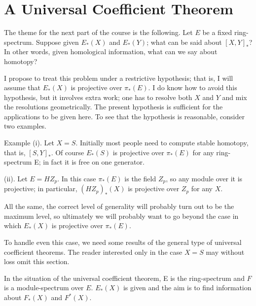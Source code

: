 \documentclass[../main]{subfiles}
\begin{document}



\chapter{A Universal Coefficient Theorem}
\label{sec:p3c13}
The theme for the next part of the course is the following. Let $E$ be a fixed ring-spectrum. Suppose given $E_\ast(X)$ and $E_\ast(Y)$; what can be said about $[X,Y]_\ast$? In other words, given homological information, what can we say about homotopy?

I propose to treat this problem under a restrictive hypothesis; that is, I will assume that $E_\ast(X)$ is projective over $\pi_\ast(E)$. I do know how to avoid this hypothesis, but it involves extra work; one has to resolve both $X$ and $Y$ and mix the resolutions geometrically. The present hypothesis is sufficient for the applications to be given here. To see that the hypothesis is reasonable, consider two examples.

Example (i). Let $X=S$. Initially most people need to compute stable homotopy, that is, $[S, Y]_\ast$. Of course $E_\ast(S)$ is projective over $\pi_\ast(E)$ for any ring-spectrum E; in fact it is free on one generator. %

(ii). Let $E = HZ_p$. In this case $\pi_\ast(E)$ is the field $Z_p$, so any module over it is projective; in particular, $(HZ_p)_\ast(X)$ is projective over $Z_p$ for any $X$.

All the same, the correct level of generality will probably turn out to be the maximum level, so ultimately we will probably want to go beyond the case in which $E_\ast(X)$ is projective over $\pi_\ast(E)$.

To handle even this case, we need some results of the general type of universal coefficient theorems. The reader interested only in the case $X=S$ may without loss omit this section.

In the situation of the universal coefficient theorem, E is the ring-spectrum and $F$ is a module-spectrum over $E$. $E_\ast(X)$ is given and the aim is to find information about $F_\ast(X)$ and $F^\ast(X)$.
\end{document}

